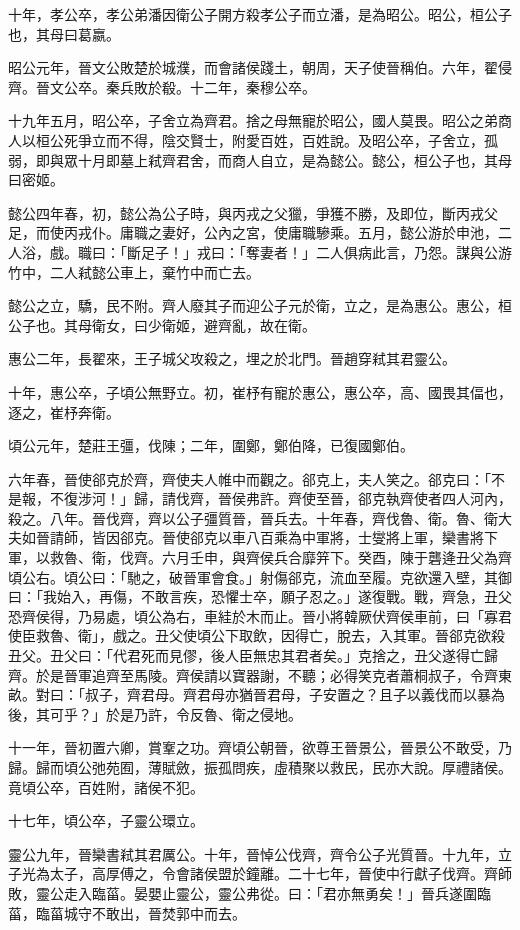 \begin{pinyinscope}
十年，孝公卒，孝公弟潘因衛公子開方殺孝公子而立潘，是為昭公。昭公，桓公子也，其母曰葛嬴。

昭公元年，晉文公敗楚於城濮，而會諸侯踐土，朝周，天子使晉稱伯。六年，翟侵齊。晉文公卒。秦兵敗於殽。十二年，秦穆公卒。

十九年五月，昭公卒，子舍立為齊君。捨之母無寵於昭公，國人莫畏。昭公之弟商人以桓公死爭立而不得，陰交賢士，附愛百姓，百姓說。及昭公卒，子舍立，孤弱，即與眾十月即墓上弒齊君舍，而商人自立，是為懿公。懿公，桓公子也，其母曰密姬。

懿公四年春，初，懿公為公子時，與丙戎之父獵，爭獲不勝，及即位，斷丙戎父足，而使丙戎仆。庸職之妻好，公內之宮，使庸職驂乘。五月，懿公游於申池，二人浴，戲。職曰：「斷足子！」戎曰：「奪妻者！」二人俱病此言，乃怨。謀與公游竹中，二人弒懿公車上，棄竹中而亡去。

懿公之立，驕，民不附。齊人廢其子而迎公子元於衛，立之，是為惠公。惠公，桓公子也。其母衛女，曰少衛姬，避齊亂，故在衛。

惠公二年，長翟來，王子城父攻殺之，埋之於北門。晉趙穿弒其君靈公。

十年，惠公卒，子頃公無野立。初，崔杼有寵於惠公，惠公卒，高、國畏其偪也，逐之，崔杼奔衛。

頃公元年，楚莊王彊，伐陳；二年，圍鄭，鄭伯降，已復國鄭伯。

六年春，晉使郤克於齊，齊使夫人帷中而觀之。郤克上，夫人笑之。郤克曰：「不是報，不復涉河！」歸，請伐齊，晉侯弗許。齊使至晉，郤克執齊使者四人河內，殺之。八年。晉伐齊，齊以公子彊質晉，晉兵去。十年春，齊伐魯、衛。魯、衛大夫如晉請師，皆因郤克。晉使郤克以車八百乘為中軍將，士燮將上軍，欒書將下軍，以救魯、衛，伐齊。六月壬申，與齊侯兵合靡笄下。癸酉，陳于礱逄丑父為齊頃公右。頃公曰：「馳之，破晉軍會食。」射傷郤克，流血至履。克欲還入壁，其御曰：「我始入，再傷，不敢言疾，恐懼士卒，願子忍之。」遂復戰。戰，齊急，丑父恐齊侯得，乃易處，頃公為右，車絓於木而止。晉小將韓厥伏齊侯車前，曰「寡君使臣救魯、衛」，戲之。丑父使頃公下取飲，因得亡，脫去，入其軍。晉郤克欲殺丑父。丑父曰：「代君死而見僇，後人臣無忠其君者矣。」克捨之，丑父遂得亡歸齊。於是晉軍追齊至馬陵。齊侯請以寶器謝，不聽；必得笑克者蕭桐叔子，令齊東畝。對曰：「叔子，齊君母。齊君母亦猶晉君母，子安置之？且子以義伐而以暴為後，其可乎？」於是乃許，令反魯、衛之侵地。

十一年，晉初置六卿，賞鞌之功。齊頃公朝晉，欲尊王晉景公，晉景公不敢受，乃歸。歸而頃公弛苑囿，薄賦斂，振孤問疾，虛積聚以救民，民亦大說。厚禮諸侯。竟頃公卒，百姓附，諸侯不犯。

十七年，頃公卒，子靈公環立。

靈公九年，晉欒書弒其君厲公。十年，晉悼公伐齊，齊令公子光質晉。十九年，立子光為太子，高厚傅之，令會諸侯盟於鐘離。二十七年，晉使中行獻子伐齊。齊師敗，靈公走入臨菑。晏嬰止靈公，靈公弗從。曰：「君亦無勇矣！」晉兵遂圍臨菑，臨菑城守不敢出，晉焚郭中而去。


\end{pinyinscope}
